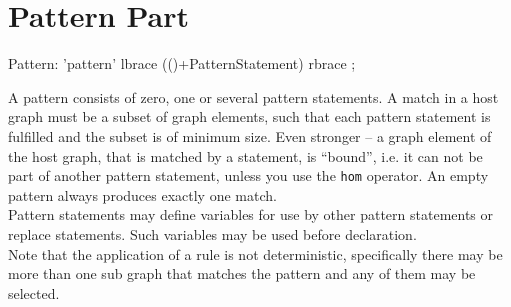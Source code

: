 \section{Pattern Part}
\label{patternpart}
\begin{rail}
  Pattern: 'pattern' lbrace (()+PatternStatement) rbrace ;
\end{rail}
A pattern consists of zero, one or several pattern statements. A match in a host graph must be a subset of graph elements, such that each pattern statement is fulfilled and the subset is of minimum size. Even stronger -- a graph element of the host graph, that is matched by a statement, is ``bound'', i.e. it can not be part of another pattern statement, unless you use the \texttt{hom} operator. An empty pattern always produces exactly one match.\\
Pattern statements may define variables for use by other pattern statements or replace statements. Such variables may be used before declaration.\\
Note that the application of a rule is not deterministic, specifically there may be more than one sub graph that matches the pattern and any of them may be selected.

